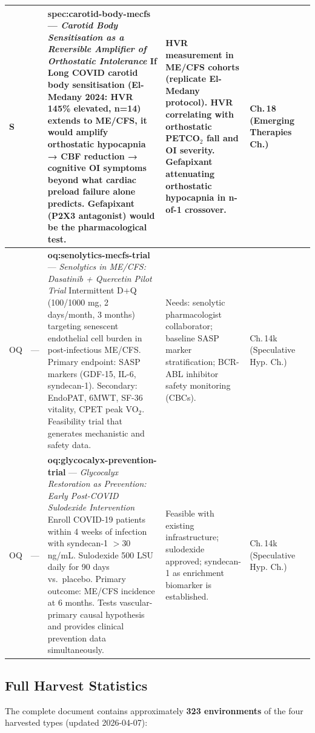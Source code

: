 \begin{longtable}{%
  p{3.0cm}
  >{\centering\arraybackslash}p{0.55cm}
  >{\centering\arraybackslash}p{1.0cm}
  p{3.8cm}
  p{3.8cm}
  p{2.2cm}
}
\hline
S & 0.25 &
\textbf{spec:carotid-body-mecfs} --- \emph{Carotid Body Sensitisation as a Reversible Amplifier of Orthostatic Intolerance}
If Long COVID carotid body sensitisation (El-Medany 2024: HVR 145\% elevated, n=14) extends to ME/CFS, it would amplify orthostatic hypocapnia → CBF reduction → cognitive OI symptoms beyond what cardiac preload failure alone predicts. Gefapixant (P2X3 antagonist) would be the pharmacological test.
&
HVR measurement in ME/CFS cohorts (replicate El-Medany protocol).
HVR correlating with orthostatic PETCO$_2$ fall and OI severity.
Gefapixant attenuating orthostatic hypocapnia in n-of-1 crossover.
&
Ch.\,18 (Emerging Therapies Ch.) \\[6pt]

\hline
OQ & --- &
\textbf{oq:senolytics-mecfs-trial} --- \emph{Senolytics in ME/CFS: Dasatinib + Quercetin Pilot Trial}
Intermittent D+Q (100/1000 mg, 2 days/month, 3 months) targeting senescent endothelial cell burden in post-infectious ME/CFS. Primary endpoint: SASP markers (GDF-15, IL-6, syndecan-1). Secondary: EndoPAT, 6MWT, SF-36 vitality, CPET peak VO$_2$. Feasibility trial that generates mechanistic and safety data.
&
Needs: senolytic pharmacologist collaborator; baseline SASP marker stratification; BCR-ABL inhibitor safety monitoring (CBCs).
&
Ch.\,14k (Speculative Hyp. Ch.) \\[6pt]

\hline
OQ & --- &
\textbf{oq:glycocalyx-prevention-trial} --- \emph{Glycocalyx Restoration as Prevention: Early Post-COVID Sulodexide Intervention}
Enroll COVID-19 patients within 4 weeks of infection with syndecan-1 $>$30 ng/mL. Sulodexide 500 LSU daily for 90 days vs.\ placebo. Primary outcome: ME/CFS incidence at 6 months. Tests vascular-primary causal hypothesis and provides clinical prevention data simultaneously.
&
Feasible with existing infrastructure; sulodexide approved; syndecan-1 as enrichment biomarker is established.
&
Ch.\,14k (Speculative Hyp. Ch.) \\[6pt]

\end{longtable}

\subsection*{Full Harvest Statistics}

The complete document contains approximately \textbf{323 environments} of the
four harvested types (updated 2026-04-07):

